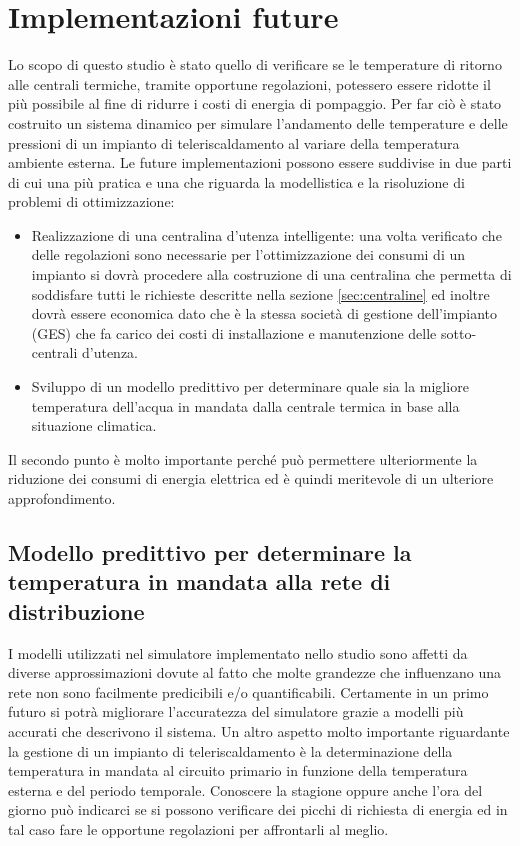 \documentclass[laurea,oneside,11pt]{USiena_tesiLM}
\begin{document}
\section{Implementazioni future}

Lo scopo di questo studio è stato quello di verificare se le temperature di ritorno alle centrali termiche, tramite opportune regolazioni, potessero essere ridotte il più possibile al fine di ridurre i costi di energia di pompaggio. Per far ciò è stato costruito un sistema dinamico per simulare l'andamento delle temperature e delle pressioni di un impianto di teleriscaldamento al variare della temperatura ambiente esterna. Le future implementazioni possono essere suddivise in due parti di cui una più pratica e una che riguarda la modellistica e la risoluzione di problemi di ottimizzazione: 
\begin{itemize}
\item  Realizzazione di una centralina d'utenza intelligente: una volta verificato che delle regolazioni sono necessarie per l'ottimizzazione dei consumi di un impianto si dovrà procedere alla costruzione di una centralina che permetta di soddisfare tutti le richieste descritte nella sezione \ref{sec:centraline} ed inoltre dovrà essere economica dato che è la stessa società  di gestione dell'impianto (GES) che fa carico dei costi di installazione e manutenzione delle sotto-centrali d'utenza.
\item Sviluppo di un modello predittivo per determinare quale sia la migliore temperatura dell'acqua in mandata dalla centrale termica in base alla situazione climatica.
\end{itemize}
Il secondo punto è molto importante perché può permettere ulteriormente la riduzione dei consumi di energia elettrica ed è quindi meritevole di un ulteriore approfondimento. 
 
\subsection{Modello predittivo per determinare la temperatura in mandata alla rete di distribuzione}
I modelli utilizzati nel simulatore implementato nello studio sono affetti da diverse approssimazioni dovute al fatto che molte grandezze che influenzano una rete non sono facilmente predicibili e/o quantificabili.
Certamente in un primo futuro si potrà migliorare l'accuratezza del simulatore grazie a modelli più accurati che descrivono il sistema. 
Un altro aspetto molto importante riguardante la gestione di un impianto di teleriscaldamento è la determinazione della temperatura in mandata al circuito primario in funzione della temperatura esterna e del periodo temporale. Conoscere la stagione oppure anche l'ora del giorno può indicarci se si possono verificare dei picchi di richiesta di energia ed in tal caso fare le opportune regolazioni per affrontarli al meglio.
\end{document}
